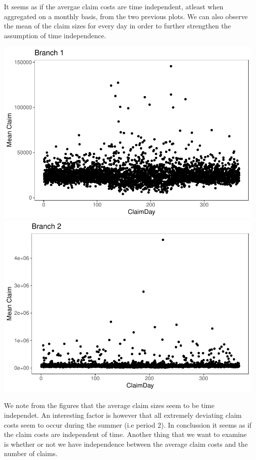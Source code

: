 \documentclass[]{article}
\begin{document}
It seems as if the avergae claim costs are time independent, atleast
when aggregated on a monthly basis, from the two previous plots. We can
also observe the mean of the claim sizes for every day in order to
further strengthen the assumption of time independence.

\includegraphics{Projekt1_files/figure-latex/unnamed-chunk-7-1.pdf}
\includegraphics{Projekt1_files/figure-latex/unnamed-chunk-7-2.pdf}

We note from the figures that the average claim sizes seem to be time
independet. An interesting factor is however that all extremely
deviating claim costs seem to occur during the summer (i.e period 2). In
conclussion it seems as if the claim costs are independent of time.
Another thing that we want to examine is whether or not we have
independence between the average claim costs and the number of claims.
\end{document}
